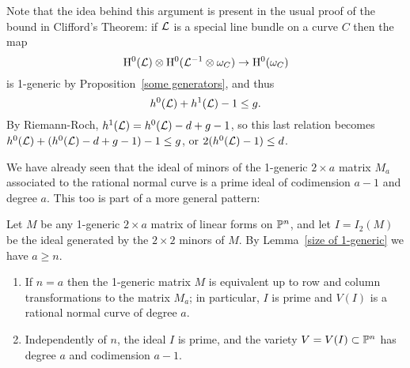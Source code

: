 Note that the idea behind this argument is present in the usual proof of the bound in Clifford's Theorem: if $\cL$ is a special
line bundle on a curve $C$ then the map 
$$
\HH^0(\cL) \otimes \HH^0(\cL^{-1}\otimes \omega_C) \to \HH^0 (\omega_C)
$$
is 1-generic by Proposition~\ref{some generators}, and thus
$$
h^0(\cL)+h^1(\cL)-1 \leq g.
$$
By Riemann-Roch,  $h^1(\cL) = h^0(\cL) -d+g-1$, so this last relation becomes
$h^0(\cL)+(h^0(\cL) -d+g-1) -1 \leq g$, or $2(h^0(\cL)-1) \leq d$.




We have already seen that the ideal of minors of the 1-generic $2\times a$ matrix $M_{a}$ associated to the rational normal curve is a prime ideal of codimension $a-1$ and degree $a$. This too is part of a more general pattern:

\begin{theorem}\label{1-generic basics} Let $M$ be any 1-generic $2\times a$ matrix of linear forms on $\PP^n$, and
let $I = I_2(M)$  be the ideal generated by the $2\times 2$ minors of $M$. By Lemma~\ref{size of 1-generic} we have $a\geq n$.
\begin{enumerate}

\item If $n = a$ then the 1-generic matrix
$M$ is equivalent up to row and column transformations to the matrix $M_{a}$;
in particular, $I$ is prime and $V(I)$ is a rational normal
curve of degree $a$.

\item Independently of $n$, the ideal $I$ is
prime, and the variety $V = V(I) \subset \PP^n$ has degree $a$ and codimension $a-1$.
\end{enumerate}

\end{theorem}

